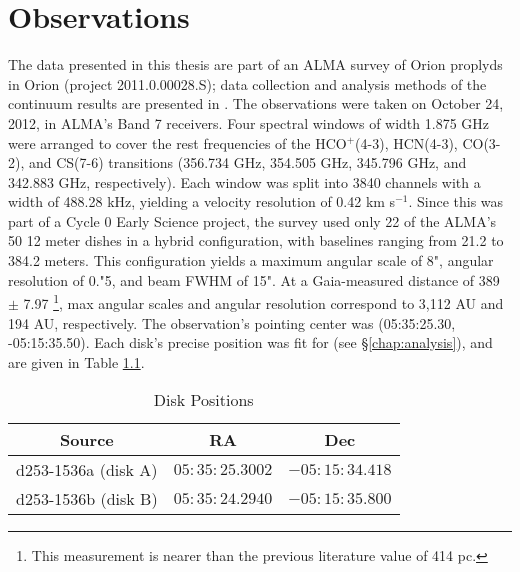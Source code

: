 \chapter{Observations}
\label{chap:observations}




The data presented in this thesis are part of an ALMA survey of Orion proplyds in Orion (project 2011.0.00028.S); data collection and analysis methods of the continuum results are presented in \citet{Mann2014}. The observations were taken on October 24, 2012, in ALMA's Band 7 receivers. Four spectral windows of width 1.875 GHz were arranged to cover the rest frequencies of the HCO$^+$(4-3), HCN(4-3), CO(3-2), and CS(7-6) transitions (356.734 GHz, 354.505 GHz, 345.796 GHz, and 342.883 GHz, respectively). Each window was split into 3840 channels with a width of 488.28 kHz, yielding a velocity resolution of 0.42 km s$^{-1}$. Since this was part of a Cycle 0 Early Science project, the survey used only 22 of the ALMA's 50 12 meter dishes in a hybrid configuration, with baselines ranging from 21.2 to 384.2 meters. This configuration yields a maximum angular scale of 8", angular resolution of 0."5, and beam FWHM of 15". At a Gaia-measured distance of 389 $\pm$ 7.97 \citep{GaiaCollaboration2016,GaiaCollaboration2018}\footnote{This measurement is nearer than the previous literature value of 414 pc.}, max angular scales and angular resolution correspond to 3,112 AU and 194 AU, respectively. The observation's pointing center was (05:35:25.30, -05:15:35.50). Each disk's precise position was fit for (see \S\ref{chap:analysis}), and are given in Table \ref{table:disk_positions}.


\begin{table}
  \centering
  \caption{Disk Positions}
  \label{table:disk_positions}
  \renewcommand{\arraystretch}{1.2}
  \begin{tabular}{c | c | c }
    \toprule \toprule
      Source      &  RA            & Dec \\
    \midrule %
      d253-1536a (disk A)  &  $05:35:25.3002$ & $-05:15:34.418$  \\
      d253-1536b (disk B)  &  $05:35:24.2940$ & $-05:15:35.800$  \\
    \bottomrule
  \end{tabular}
\end{table}

